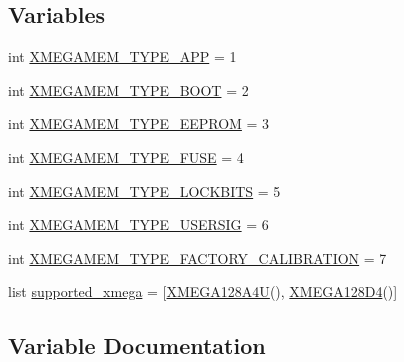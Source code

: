 \subsection*{Variables}
\begin{DoxyCompactItemize}
\item 
int \hyperlink{namespacesoftware_1_1chipwhisperer_1_1hardware_1_1naeusb_1_1programmer__xmega_a4406d79ffe510a0a5318f37c88cfb03e}{X\+M\+E\+G\+A\+M\+E\+M\+\_\+\+T\+Y\+P\+E\+\_\+\+A\+P\+P} = 1
\item 
int \hyperlink{namespacesoftware_1_1chipwhisperer_1_1hardware_1_1naeusb_1_1programmer__xmega_adcab411c858595d11bcf9331251542a2}{X\+M\+E\+G\+A\+M\+E\+M\+\_\+\+T\+Y\+P\+E\+\_\+\+B\+O\+O\+T} = 2
\item 
int \hyperlink{namespacesoftware_1_1chipwhisperer_1_1hardware_1_1naeusb_1_1programmer__xmega_a86404b30272d9a3ca6a6fcf1ffb8e5db}{X\+M\+E\+G\+A\+M\+E\+M\+\_\+\+T\+Y\+P\+E\+\_\+\+E\+E\+P\+R\+O\+M} = 3
\item 
int \hyperlink{namespacesoftware_1_1chipwhisperer_1_1hardware_1_1naeusb_1_1programmer__xmega_a1997b36ef46169a3efd38657a02e4b7a}{X\+M\+E\+G\+A\+M\+E\+M\+\_\+\+T\+Y\+P\+E\+\_\+\+F\+U\+S\+E} = 4
\item 
int \hyperlink{namespacesoftware_1_1chipwhisperer_1_1hardware_1_1naeusb_1_1programmer__xmega_aff20d6cf39708822b4321e223ab6a9fd}{X\+M\+E\+G\+A\+M\+E\+M\+\_\+\+T\+Y\+P\+E\+\_\+\+L\+O\+C\+K\+B\+I\+T\+S} = 5
\item 
int \hyperlink{namespacesoftware_1_1chipwhisperer_1_1hardware_1_1naeusb_1_1programmer__xmega_aab73401478df0572d05bdceacfccfee1}{X\+M\+E\+G\+A\+M\+E\+M\+\_\+\+T\+Y\+P\+E\+\_\+\+U\+S\+E\+R\+S\+I\+G} = 6
\item 
int \hyperlink{namespacesoftware_1_1chipwhisperer_1_1hardware_1_1naeusb_1_1programmer__xmega_a96910f5c511d7a8dd0ca06e7d907f527}{X\+M\+E\+G\+A\+M\+E\+M\+\_\+\+T\+Y\+P\+E\+\_\+\+F\+A\+C\+T\+O\+R\+Y\+\_\+\+C\+A\+L\+I\+B\+R\+A\+T\+I\+O\+N} = 7
\item 
list \hyperlink{namespacesoftware_1_1chipwhisperer_1_1hardware_1_1naeusb_1_1programmer__xmega_ae9e54739e11f37338b620a542ab8d773}{supported\+\_\+xmega} = \mbox{[}\hyperlink{classsoftware_1_1chipwhisperer_1_1hardware_1_1naeusb_1_1programmer__xmega_1_1XMEGA128A4U}{X\+M\+E\+G\+A128\+A4\+U}(), \hyperlink{classsoftware_1_1chipwhisperer_1_1hardware_1_1naeusb_1_1programmer__xmega_1_1XMEGA128D4}{X\+M\+E\+G\+A128\+D4}()\mbox{]}
\end{DoxyCompactItemize}


\subsection{Variable Documentation}
\hypertarget{namespacesoftware_1_1chipwhisperer_1_1hardware_1_1naeusb_1_1programmer__xmega_ae9e54739e11f37338b620a542ab8d773}{}
